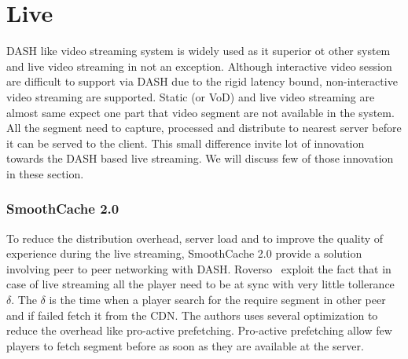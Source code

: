 
\section{Live}
DASH like video streaming system is widely used as it superior ot other system and live video streaming in not an exception. Although interactive video session are difficult to support via DASH due to the rigid latency bound, non-interactive video streaming are supported. Static (or VoD) and live video streaming are almost same expect one part that video segment are not available in the system. All the segment need to capture, processed and distribute to nearest server before it can be served to the client. This small difference invite lot of innovation towards the DASH based live streaming. We will discuss few of those innovation in these section.

\subsubsection{SmoothCache 2.0}
To reduce the distribution overhead, server load and to improve the quality of experience during the live streaming, SmoothCache 2.0\cite{10.1145/2713168.2713182} provide a solution involving peer to peer networking with DASH. Roverso \etal\ exploit the fact that in case of live streaming all the player need to be at sync with very little tollerance $\delta$. The $\delta$ is the time when a player search for the require segment in other peer and if failed fetch it from the CDN. The authors uses several optimization to reduce the overhead like pro-active prefetching. Pro-active prefetching allow few players to fetch segment before as soon as they are available at the server. 